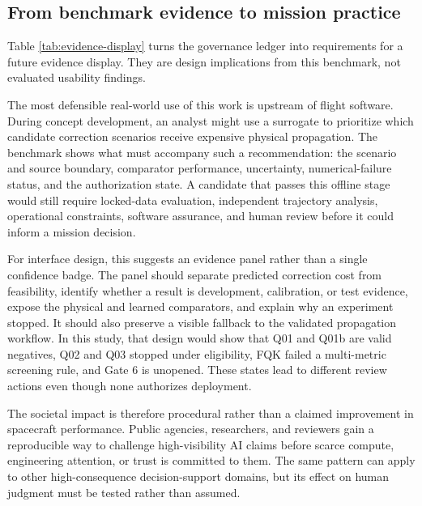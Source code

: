\subsection{From benchmark evidence to mission practice}

Table \ref{tab:evidence-display} turns the governance ledger into requirements
for a future evidence display. They are design implications from this
benchmark, not evaluated usability findings.

The most defensible real-world use of this work is upstream of flight software.
During concept development, an analyst might use a surrogate to prioritize
which candidate correction scenarios receive expensive physical propagation.
The benchmark shows what must accompany such a recommendation: the scenario
and source boundary, comparator performance, uncertainty, numerical-failure
status, and the authorization state. A candidate that passes this offline
stage would still require locked-data evaluation, independent trajectory
analysis, operational constraints, software assurance, and human review before
it could inform a mission decision.

For interface design, this suggests an evidence panel rather than a single
confidence badge. The panel should separate predicted correction cost from
feasibility, identify whether a result is development, calibration, or test
evidence, expose the physical and learned comparators, and explain why an
experiment stopped. It should also preserve a visible fallback to the
validated propagation workflow. In this study, that design would show that
Q01 and Q01b are valid negatives, Q02 and Q03 stopped under eligibility, FQK
failed a multi-metric screening rule, and Gate 6 is unopened. These states lead
to different review actions even though none authorizes deployment.

The societal impact is therefore procedural rather than a claimed improvement
in spacecraft performance. Public agencies, researchers, and reviewers gain a
reproducible way to challenge high-visibility AI claims before scarce compute,
engineering attention, or trust is committed to them. The same pattern can
apply to other high-consequence decision-support domains, but its effect on
human judgment must be tested rather than assumed.

